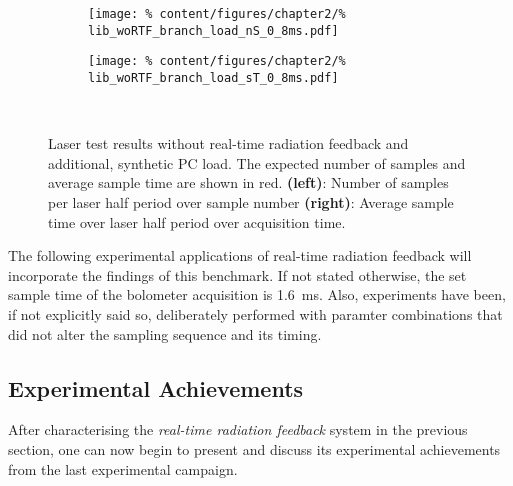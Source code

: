             \begin{figure}[t]%
                \centering%
                \begin{subfigure}{0.48\textwidth}%
                    \texttt{[image: \%
                        content/figures/chapter2/\%
                        lib\_woRTF\_branch\_load\_nS\_0\_8ms.pdf]}%
                \end{subfigure}%
                \hspace*{0.25cm}%
                \begin{subfigure}{0.48\textwidth}%
                    \texttt{[image: \%
                        content/figures/chapter2/\%
                        lib\_woRTF\_branch\_load\_sT\_0\_8ms.pdf]}%
                \end{subfigure}\\%
                \caption{Laser test results without real-time radiation feedback and additional, synthetic PC load. The expected number of samples and average sample time are shown in red. \textbf{(left)}: Number of samples per laser half period over sample number \textbf{(right)}: Average sample time over laser half period over acquisition time.}\label{fig:woRTF_load}%
            \end{figure}%
%
            The following experimental applications of real-time radiation feedback will incorporate the findings of this benchmark. If not stated otherwise, the set sample time of the bolometer acquisition is \SI{1.6}{\milli\second}. Also, experiments have been, if not explicitly said so, deliberately performed with paramter combinations that did not alter the sampling sequence and its timing.%
%
    \subsection{Experimental Achievements}\label{sec:feedbackachieve}%
%
        After characterising the \textit{real-time radiation feedback} system in the previous section, one can now begin to present and discuss its experimental achievements from the last experimental campaign.%

